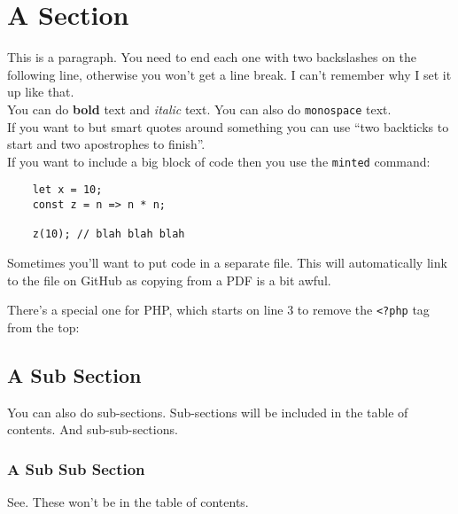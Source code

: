 \section{A Section}

This is a paragraph. You need to end each one with two backslashes on the following line, otherwise you won't get a line break. I can't remember why I set it up like that.
\\

You can do \textbf{bold} text and \textit{italic} text. You can also do \texttt{monospace} text.
\\

If you want to but smart quotes around something you can use ``two backticks to start and two apostrophes to finish''.
\\

If you want to include a big block of code then you use the \texttt{minted} command:

\begin{verbatim}
    let x = 10;
    const z = n => n * n;

    z(10); // blah blah blah
\end{verbatim}

Sometimes you'll want to put code in a separate file. This will automatically link to the file on GitHub as copying from a PDF is a bit awful.


\pagebreak

There's a special one for PHP, which starts on line 3 to remove the \texttt{<?php} tag from the top:


\subsection{A Sub Section}

You can also do sub-sections. Sub-sections will be included in the table of contents. And sub-sub-sections.

\subsubsection{A Sub Sub Section}

See. These won't be in the table of contents.
\\

